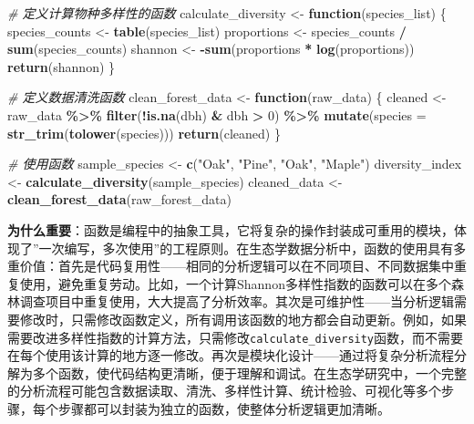 \documentclass[
  twoside]{book}
\newenvironment{Shaded}{\begin{snugshade}}{\end{snugshade}}
\newcommand{\AttributeTok}[1]{\textcolor[rgb]{0.13,0.29,0.53}{#1}}
\newcommand{\CommentTok}[1]{\textcolor[rgb]{0.56,0.35,0.01}{\textit{#1}}}
\newcommand{\ControlFlowTok}[1]{\textcolor[rgb]{0.13,0.29,0.53}{\textbf{#1}}}
\newcommand{\DecValTok}[1]{\textcolor[rgb]{0.00,0.00,0.81}{#1}}
\newcommand{\FunctionTok}[1]{\textcolor[rgb]{0.13,0.29,0.53}{\textbf{#1}}}
\newcommand{\NormalTok}[1]{#1}
\newcommand{\OtherTok}[1]{\textcolor[rgb]{0.56,0.35,0.01}{#1}}
\newcommand{\SpecialCharTok}[1]{\textcolor[rgb]{0.81,0.36,0.00}{\textbf{#1}}}
\newcommand{\StringTok}[1]{\textcolor[rgb]{0.31,0.60,0.02}{#1}}
\begin{document}
\begin{Shaded}
\begin{Highlighting}[]
\CommentTok{\# 定义计算物种多样性的函数}
\NormalTok{calculate\_diversity }\OtherTok{\textless{}{-}} \ControlFlowTok{function}\NormalTok{(species\_list) \{}
\NormalTok{  species\_counts }\OtherTok{\textless{}{-}} \FunctionTok{table}\NormalTok{(species\_list)}
\NormalTok{  proportions }\OtherTok{\textless{}{-}}\NormalTok{ species\_counts }\SpecialCharTok{/} \FunctionTok{sum}\NormalTok{(species\_counts)}
\NormalTok{  shannon }\OtherTok{\textless{}{-}} \SpecialCharTok{{-}}\FunctionTok{sum}\NormalTok{(proportions }\SpecialCharTok{*} \FunctionTok{log}\NormalTok{(proportions))}
  \FunctionTok{return}\NormalTok{(shannon)}
\NormalTok{\}}

\CommentTok{\# 定义数据清洗函数}
\NormalTok{clean\_forest\_data }\OtherTok{\textless{}{-}} \ControlFlowTok{function}\NormalTok{(raw\_data) \{}
\NormalTok{  cleaned }\OtherTok{\textless{}{-}}\NormalTok{ raw\_data }\SpecialCharTok{\%\textgreater{}\%}
    \FunctionTok{filter}\NormalTok{(}\SpecialCharTok{!}\FunctionTok{is.na}\NormalTok{(dbh) }\SpecialCharTok{\&}\NormalTok{ dbh }\SpecialCharTok{\textgreater{}} \DecValTok{0}\NormalTok{) }\SpecialCharTok{\%\textgreater{}\%}
    \FunctionTok{mutate}\NormalTok{(}\AttributeTok{species =} \FunctionTok{str\_trim}\NormalTok{(}\FunctionTok{tolower}\NormalTok{(species)))}
  \FunctionTok{return}\NormalTok{(cleaned)}
\NormalTok{\}}

\CommentTok{\# 使用函数}
\NormalTok{sample\_species }\OtherTok{\textless{}{-}} \FunctionTok{c}\NormalTok{(}\StringTok{"Oak"}\NormalTok{, }\StringTok{"Pine"}\NormalTok{, }\StringTok{"Oak"}\NormalTok{, }\StringTok{"Maple"}\NormalTok{)}
\NormalTok{diversity\_index }\OtherTok{\textless{}{-}} \FunctionTok{calculate\_diversity}\NormalTok{(sample\_species)}
\NormalTok{cleaned\_data }\OtherTok{\textless{}{-}} \FunctionTok{clean\_forest\_data}\NormalTok{(raw\_forest\_data)}
\end{Highlighting}
\end{Shaded}

\textbf{为什么重要}：函数是编程中的抽象工具，它将复杂的操作封装成可重用的模块，体现了''一次编写，多次使用''的工程原则。在生态学数据分析中，函数的使用具有多重价值：首先是代码复用性------相同的分析逻辑可以在不同项目、不同数据集中重复使用，避免重复劳动。比如，一个计算Shannon多样性指数的函数可以在多个森林调查项目中重复使用，大大提高了分析效率。其次是可维护性------当分析逻辑需要修改时，只需修改函数定义，所有调用该函数的地方都会自动更新。例如，如果需要改进多样性指数的计算方法，只需修改\texttt{calculate\_diversity}函数，而不需要在每个使用该计算的地方逐一修改。再次是模块化设计------通过将复杂分析流程分解为多个函数，使代码结构更清晰，便于理解和调试。在生态学研究中，一个完整的分析流程可能包含数据读取、清洗、多样性计算、统计检验、可视化等多个步骤，每个步骤都可以封装为独立的函数，使整体分析逻辑更加清晰。
\end{document}
